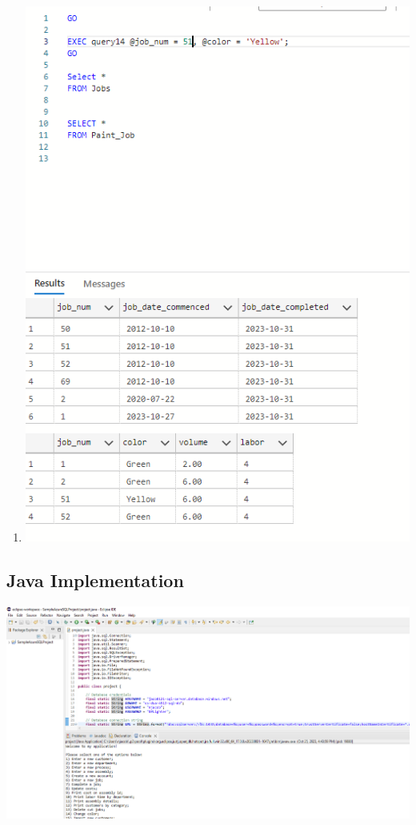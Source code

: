 \documentclass[11pt]{article}
\begin{document}
\begin{enumerate}
\item
\includegraphics[width = \textwidth]{changepaint.png}

\end{enumerate}
\subsection{Java Implementation}
\includegraphics[width = \textwidth]{JavaSuccess.png}
\end{document}
